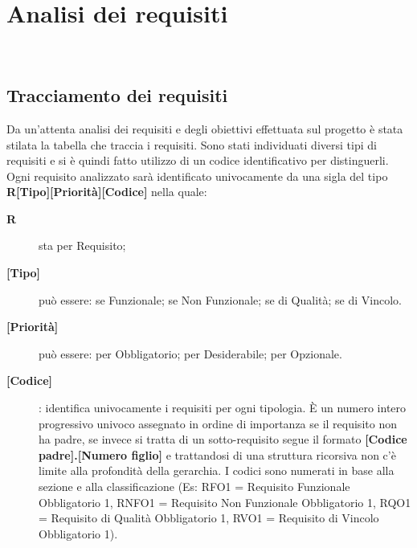 \chapter{Analisi dei requisiti}
\label{cap:analisi-requisiti}

\\

\section{Tracciamento dei requisiti}
    Da un'attenta analisi dei requisiti e degli obiettivi effettuata sul progetto è stata stilata la tabella che traccia i requisiti.
    Sono stati individuati diversi tipi di requisiti e si è quindi fatto utilizzo di un codice identificativo per distinguerli.\\
    Ogni requisito analizzato sarà identificato univocamente da una sigla del tipo \textbf{R[Tipo][Priorità][Codice]} nella quale:
    \begin{description}
        \item[\textbf{R}] sta per Requisito;

        \item[\textbf{[Tipo]}] può essere:
        \subitem[\textbf{F}] se Funzionale;
        \subitem[\textbf{NF}] se Non Funzionale;
        \subitem[\textbf{Q}] se di Qualità;
        \subitem[\textbf{V}] se di Vincolo.

        \item[\textbf{[Priorità]}] può essere:
        \subitem[\textbf{O}] per Obbligatorio;
        \subitem[\textbf{D}] per Desiderabile;
        \subitem[\textbf{P}] per Opzionale.
        
        \item[\textbf{[Codice]}]: identifica univocamente i requisiti per ogni tipologia. È un numero intero progressivo univoco assegnato in ordine di importanza se il requisito non ha padre, 
        se invece si tratta di un sotto-requisito segue il formato \textbf{[Codice padre].[Numero figlio]} e trattandosi di una struttura ricorsiva non c'è limite alla profondità della gerarchia. I codici sono numerati in base alla sezione e alla classificazione (Es: RFO1 = Requisito Funzionale Obbligatorio 1, RNFO1 = Requisito Non Funzionale Obbligatorio 1, RQO1 = Requisito di Qualità Obbligatorio 1, RVO1 = Requisito di Vincolo Obbligatorio 1).
    \end{description}

